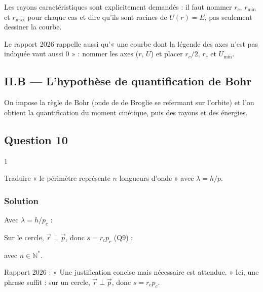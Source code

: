 \documentclass[11pt,a4paper]{article}
\newcommand{\equationajustee}[1]{%
  \sbox{\boiteequation}{$\displaystyle #1$}%
  \ifdim\wd\boiteequation>\linewidth
    \[\resizebox{\linewidth}{!}{\usebox{\boiteequation}}\]%
  \else
    \[#1\]%
  \fi}
\begin{document}
\begin{jury}

Les rayons caractéristiques sont explicitement demandés : il faut nommer \(r_c\), \(r_{\min}\) et \(r_{\max}\) pour chaque cas et dire qu'ils sont racines de \(U(r)=E\), pas seulement dessiner la courbe.

Le rapport 2026 rappelle aussi qu'« une courbe dont la légende des axes n'est pas indiquée vaut aussi 0 » : nommer les axes (\(r\), \(U\)) et placer \(r_c/2\), \(r_c\) et \(U_{\min}\).

\end{jury}

\hypertarget{ii.b-lhypothuxe8se-de-quantification-de-bohr}{%
\subsection{II.B --- L'hypothèse de quantification de Bohr}\label{ii.b-lhypothuxe8se-de-quantification-de-bohr}}

On impose la règle de Bohr (onde de de Broglie se refermant sur l'orbite) et l'on obtient la quantification du moment cinétique, puis des rayons et des énergies.

\hypertarget{question-10}{%
\subsection{Question 10}\label{question-10}}

\begin{indication}{1}

Traduire « le périmètre représente \(n\) longueurs d'onde » avec \(\lambda=h/p\).

\end{indication}

\hypertarget{solution-9}{%
\subsubsection{Solution}\label{solution-9}}

Avec \(\lambda=h/p_c\) :

\equationajustee{2\pi r_c=n\lambda=\frac{nh}{p_c}.}

Sur le cercle, \(\vec r\perp\vec p\), donc \(s=r_cp_c\) (Q9) :

\equationajustee{\boxed{s=n\hbar=\frac{nh}{2\pi}}}

avec \(n\in\mathbb N^*\).

\begin{jury}

Rapport 2026 : « Une justification concise mais nécessaire est attendue. » Ici, une phrase suffit : sur un cercle, \(\vec r\perp\vec p\), donc \(s=r_cp_c\).

\end{jury}
\end{document}
